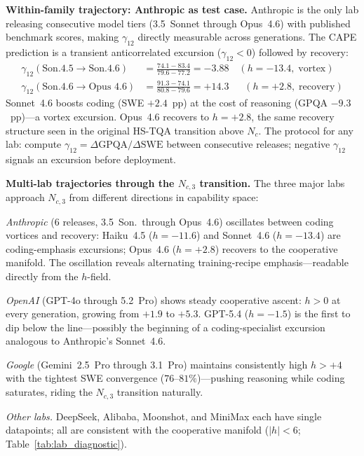 \documentclass[11pt]{article}
\begin{document}
\textbf{Within-family trajectory: Anthropic as test case.}
Anthropic is the only lab releasing consecutive model tiers (3.5~Sonnet through Opus~4.6) with published benchmark scores, making $\gamma_{12}$ directly measurable across generations.
The CAPE prediction is a transient anticorrelated excursion ($\gamma_{12} < 0$) followed by recovery:
\begin{align*}
  \gamma_{12}(\text{Son.4.5}\to\text{Son.4.6}) &= \frac{74.1 - 83.4}{79.6 - 77.2} = -3.88 \quad (h = -13.4,\;\text{vortex}) \\
  \gamma_{12}(\text{Son.4.6}\to\text{Opus~4.6}) &= \frac{91.3 - 74.1}{80.8 - 79.6} = +14.3 \quad\;\; (h = +2.8,\;\text{recovery})
\end{align*}
Sonnet~4.6 boosts coding (SWE $+2.4$~pp) at the cost of reasoning (GPQA $-9.3$~pp)---a vortex excursion.
Opus~4.6 recovers to $h = +2.8$, the same recovery structure seen in the original HS-TQA transition above $N_c$.
The protocol for any lab: compute $\gamma_{12} = \Delta\text{GPQA}/\Delta\text{SWE}$ between consecutive releases; negative $\gamma_{12}$ signals an excursion before deployment.

\textbf{Multi-lab trajectories through the $N_{c,3}$ transition.}
The three major labs approach $N_{c,3}$ from different directions in capability space:

\smallskip\noindent\textit{Anthropic} (6 releases, 3.5~Son.\ through Opus~4.6) oscillates between coding vortices and recovery: Haiku~4.5 ($h = -11.6$) and Sonnet~4.6 ($h = -13.4$) are coding-emphasis excursions; Opus~4.6 ($h = +2.8$) recovers to the cooperative manifold. The oscillation reveals alternating training-recipe emphasis---readable directly from the $h$-field.

\smallskip\noindent\textit{OpenAI} (GPT-4o through 5.2~Pro) shows steady cooperative ascent: $h > 0$ at every generation, growing from $+1.9$ to $+5.3$. GPT-5.4 ($h = -1.5$) is the first to dip below the line---possibly the beginning of a coding-specialist excursion analogous to Anthropic's Sonnet~4.6.

\smallskip\noindent\textit{Google} (Gemini~2.5~Pro through 3.1~Pro) maintains consistently high $h > +4$ with the tightest SWE convergence ($76$--$81\%$)---pushing reasoning while coding saturates, riding the $N_{c,3}$ transition naturally.

\smallskip\noindent\textit{Other labs.} DeepSeek, Alibaba, Moonshot, and MiniMax each have single datapoints; all are consistent with the cooperative manifold ($|h| < 6$; Table~\ref{tab:lab_diagnostic}).
\end{document}
